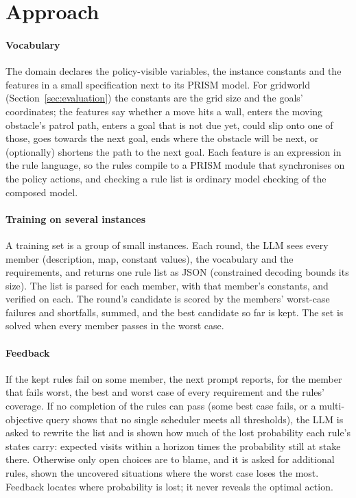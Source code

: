 \section{Approach}\label{sec:approach}

\paragraph*{Vocabulary}
The domain declares the policy-visible variables, the instance constants and the features in a small specification
next to its PRISM model. For gridworld (Section~\ref{sec:evaluation}) the constants are the grid size and the goals'
coordinates; the features say whether a move hits a wall, enters the moving obstacle's patrol path, enters a goal
that is not due yet, could slip onto one of those, goes towards the next goal, ends where the obstacle will be next,
or (optionally) shortens the path to the next goal. Each feature is an expression in the rule language, so the rules
compile to a PRISM module that synchronises on the policy actions, and checking a rule list is ordinary model
checking of the composed model.

\paragraph*{Training on several instances}
A training set is a group of small instances. Each round, the LLM sees every member (description, map, constant
values), the vocabulary and the requirements, and returns one rule list as JSON (constrained decoding bounds its
size). The list is parsed for each member, with that member's constants, and verified on each. The round's
candidate is scored by the members' worst-case failures and shortfalls, summed, and the best candidate so far is
kept. The set is solved when every member passes in the worst case.

\paragraph*{Feedback}
If the kept rules fail on some member, the next prompt reports, for the member that fails worst, the best and worst
case of every requirement and the rules' coverage. If no completion of the rules can pass (some best case fails, or a
multi-objective query shows that no single scheduler meets all thresholds), the LLM is asked to rewrite the list and
is shown how much of the lost probability each rule's states carry: expected visits within a horizon times the
probability still at stake there. Otherwise only open choices are to blame, and it is asked for additional rules,
shown the uncovered situations where the worst case loses the most. Feedback locates where probability is lost; it
never reveals the optimal action.

